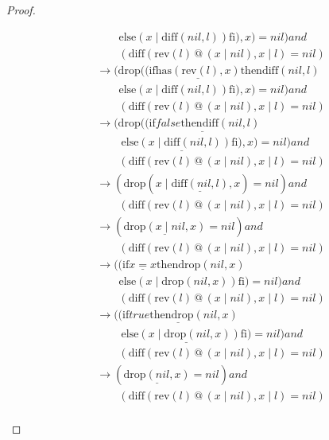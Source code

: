 \documentclass[12pt, a4paper]{article}
\newcommand{\rel}[1]{\mathrel{#1}}
\newcommand{\rmx}[1]{\mathrm{#1}}
\newcommand{\larrow}{\longrightarrow}
\newcommand{\under}{\underline}
\begin{document}
\begin{proof}
\begin{description}
\begin{align*}
	 &\quad \quad \rel{\rmx{else}} (x \mid \rmx{diff}(nil, l)) \rel{\rmx{fi}}), x) = nil) \rel{and} \\
	&\quad \quad (\rmx{diff}(\rmx{rev}(l) \rel{@} (x \mid nil), x \mid l) = nil) \tag{by diff2} \\
	 &\larrow (\rmx{drop}((\rel{\rmx{if}} \under{\rmx{has}(\rmx{rev}(l), x)} \rel{\rmx{then}} \rmx{diff}(nil, l) \\
	 &\quad \quad \rel{\rmx{else}} (x \mid \rmx{diff}(nil, l)) \rel{\rmx{fi}}), x) = nil) \rel{and} \\
	&\quad \quad (\rmx{diff}(\rmx{rev}(l) \rel{@} (x \mid nil), x \mid l) = nil) \tag{by Problem 6} \\
	 &\larrow (\rmx{drop}(\under{(\rel{\rmx{if}} false \rel{\rmx{then}} \rmx{diff}(nil, l)} \\
	 &\quad \quad\ \under{\rel{\rmx{else}} (x \mid \rmx{diff}(nil, l)) \rel{\rmx{fi}})}, x) = nil) \rel{and} \\
	&\quad \quad (\rmx{diff}(\rmx{rev}(l) \rel{@} (x \mid nil), x \mid l) = nil) \tag{by case splitting} \\
	 &\larrow (\rmx{drop}(x \mid \under{\rmx{diff}(nil, l)}, x) = nil) \rel{and} \\
	&\quad \quad (\rmx{diff}(\rmx{rev}(l) \rel{@} (x \mid nil), x \mid l) = nil) \tag{by if2} \\
	&\larrow (\under{\rmx{drop}(x \mid nil, x)} = nil) \rel{and} \\
	&\quad \quad (\rmx{diff}(\rmx{rev}(l) \rel{@} (x \mid nil), x \mid l) = nil) \tag{by diff1} \\
	&\larrow ((\rel{\rmx{if}} \under{x = x} \rel{\rmx{then}} \rmx{drop}(nil, x) \\
	&\quad \quad \rel{\rmx{else}} (x \mid \rmx{drop}(nil, x)) \rel{\rmx{fi}}) = nil) \rel{and} \\
	&\quad \quad (\rmx{diff}(\rmx{rev}(l) \rel{@} (x \mid nil), x \mid l) = nil) \tag{by drop2} \\
	&\larrow (\under{(\rel{\rmx{if}} true \rel{\rmx{then}} \rmx{drop}(nil, x)} \\
	&\quad \quad\ \under{\rel{\rmx{else}} (x \mid \rmx{drop}(nil, x)) \rel{\rmx{fi}})} = nil) \rel{and} \\
	&\quad \quad (\rmx{diff}(\rmx{rev}(l) \rel{@} (x \mid nil), x \mid l) = nil) \tag{by equality} \\
	&\larrow (\under{\rmx{drop}(nil, x)} = nil) \rel{and} \\
	&\quad \quad (\rmx{diff}(\rmx{rev}(l) \rel{@} (x \mid nil), x \mid l) = nil) \tag{by if1} \\

\end{align*}
\end{description}
\end{proof}
\end{document}
